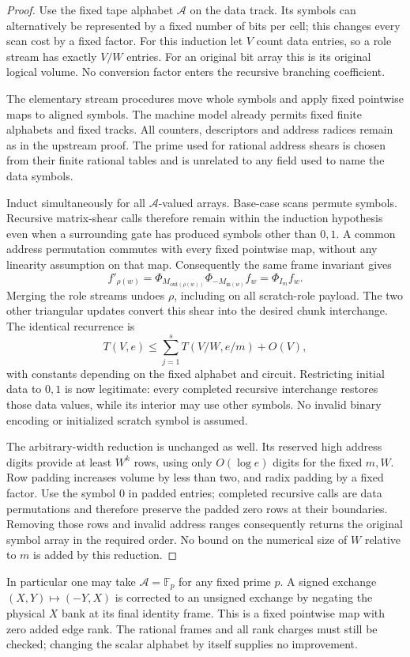 \begin{proof}
Use the fixed tape alphabet $\mathcal A$ on the data track. Its symbols
can alternatively be represented by a fixed number of bits per cell;
this changes every scan cost by a fixed factor. For this induction let
$V$ count data entries, so a role stream has exactly $V/W$ entries.
For an original bit array this is its original logical volume. No
conversion factor enters the recursive branching coefficient.

The elementary stream procedures move whole symbols and apply fixed
pointwise maps to aligned symbols. The machine model already permits
fixed finite alphabets and fixed tracks. All counters, descriptors and
address radices remain as in the upstream proof. The prime used for
rational address shears is chosen from their finite rational tables and
is unrelated to any field used to name the data symbols.

Induct simultaneously for all $\mathcal A$-valued arrays. Base-case scans
permute symbols. Recursive matrix-shear calls therefore remain within
the induction hypothesis even when a surrounding gate has produced
symbols other than $0,1$. A common address permutation commutes with
every fixed pointwise map, without any linearity assumption on that map.
Consequently the same frame invariant gives
\[
 f'_{\rho(w)}=\Phi_{M_{\mathrm{out}(\rho(w))}}
             \Phi_{-M_{\mathrm{in}(w)}}f_w=\Phi_{I_m}f_w.
\]
Merging the role streams undoes $\rho$, including on all scratch-role
payload. The two other triangular updates convert this shear into the
desired chunk interchange. The identical recurrence is
\[
 T(V,e)\le\sum_{j=1}^s T(V/W,e/m)+O(V),
\]
with constants depending on the fixed alphabet and circuit. Restricting
initial data to $0,1$ is now legitimate: every completed recursive
interchange restores those data values, while its interior may use other
symbols. No invalid binary encoding or initialized scratch symbol is
assumed.

The arbitrary-width reduction is unchanged as well. Its reserved high
address digits provide at least $W^k$ rows, using only $O(\log e)$ digits
for the fixed $m,W$. Row padding increases volume by less than two, and
radix padding by a fixed factor. Use the symbol $0$ in padded entries;
completed recursive calls are data permutations and therefore preserve
the padded zero rows at their boundaries. Removing those rows and invalid
address ranges consequently returns the original symbol array in the
required order. No bound on the numerical size of $W$ relative to $m$
is added by this reduction.
\end{proof}

In particular one may take $\mathcal A=\mathbb F_p$ for any fixed prime
$p$. A signed exchange $(X,Y)\mapsto(-Y,X)$ is corrected to an unsigned
exchange by negating the physical $X$ bank at its final identity frame.
This is a fixed pointwise map with zero added edge rank. The rational
frames and all rank charges must still be checked; changing the scalar
alphabet by itself supplies no improvement.
